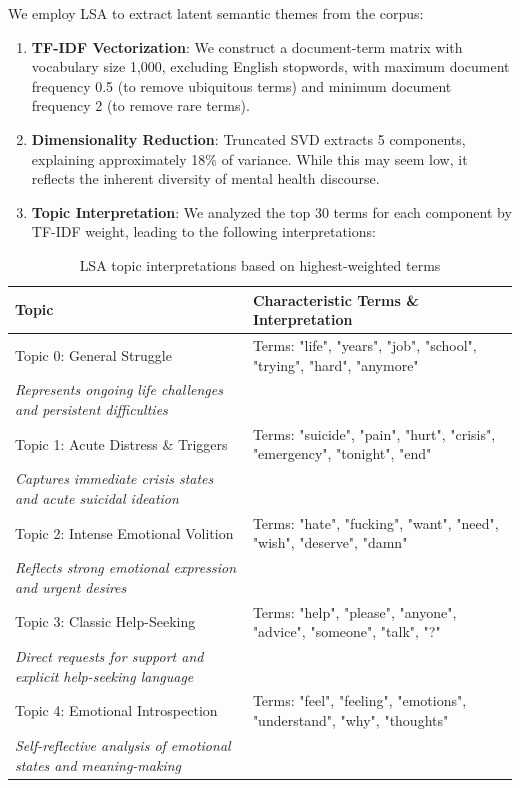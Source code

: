 \documentclass[letterpaper]{article} %
\begin{document}
We employ LSA to extract latent semantic themes from the corpus:

\begin{enumerate}
\item \textbf{TF-IDF Vectorization}: We construct a document-term matrix with vocabulary size 1,000, excluding English stopwords, with maximum document frequency 0.5 (to remove ubiquitous terms) and minimum document frequency 2 (to remove rare terms).

\item \textbf{Dimensionality Reduction}: Truncated SVD extracts 5 components, explaining approximately 18\% of variance. While this may seem low, it reflects the inherent diversity of mental health discourse.

\item \textbf{Topic Interpretation}: We analyzed the top 30 terms for each component by TF-IDF weight, leading to the following interpretations:
\end{enumerate}

\begin{table}[h]
\centering
\caption{LSA topic interpretations based on highest-weighted terms}
\small
\begin{tabular}{p{6cm}p{11cm}}
\toprule
\textbf{Topic} & \textbf{Characteristic Terms \& Interpretation} \\
\midrule
Topic 0: General Struggle & 
Terms: "life", "years", "job", "school", "trying", "hard", "anymore"\\
\textit{Represents ongoing life challenges and persistent difficulties} \\
\midrule
Topic 1: Acute Distress \& Triggers & 
Terms: "suicide", "pain", "hurt", "crisis", "emergency", "tonight", "end"\\
\textit{Captures immediate crisis states and acute suicidal ideation} \\
\midrule
Topic 2: Intense Emotional Volition & 
Terms: "hate", "fucking", "want", "need", "wish", "deserve", "damn"\\
\textit{Reflects strong emotional expression and urgent desires} \\
\midrule
Topic 3: Classic Help-Seeking & 
Terms: "help", "please", "anyone", "advice", "someone", "talk", "?"\\
\textit{Direct requests for support and explicit help-seeking language} \\
\midrule
Topic 4: Emotional Introspection & 
Terms: "feel", "feeling", "emotions", "understand", "why", "thoughts"\\
\textit{Self-reflective analysis of emotional states and meaning-making} \\
\bottomrule
\end{tabular}
\end{table}
\end{document}
